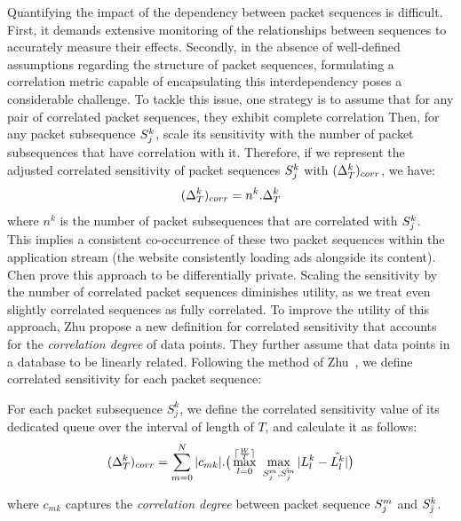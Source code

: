Quantifying the impact of the dependency between packet sequences is difficult. 
First, it demands extensive monitoring of the relationships between sequences to accurately measure their effects.
Secondly,  in the absence of well-defined assumptions regarding the structure of packet sequences, formulating a correlation metric capable of encapsulating this interdependency poses a considerable challenge.
To tackle this issue, one strategy is to assume that for any pair of correlated packet sequences, they exhibit complete correlation
Then, for any packet subsequence $S^k_j$, scale its sensitivity with the number of packet subsequences that have correlation with it.
Therefore, if we represent the adjusted correlated sensitivity of packet sequences $S^k_j$ with $(\Delta_T^k)_{corr}$, we have:
\begin{equation}\label{equ:naive-correlated-sensitivity}
  (\Delta_T^k)_{corr} = n^k.\Delta_T^k 
\end{equation}
\noindent where $n^k$ is the number of packet subsequences that are correlated with $S^k_j$.
\\
This implies a consistent co-occurrence of these two packet sequences within the application stream (\eg the website consistently loading ads alongside its content).
Chen prove this approach to be differentially private.
Scaling the sensitivity by the number of correlated packet sequences diminishes utility, as we treat even slightly correlated sequences as fully correlated.
To improve the utility of this approach, Zhu propose a new definition for correlated sensitivity that accounts for the \textit{correlation degree} of data points. 
They further assume that data points in a database to be linearly related.  
Following the method of Zhu~\etal, we define correlated sensitivity for each packet sequence:
\begin{definition}\label{def:correlated-sensitivity} 
  For each packet subsequence $S_{j}^k$, we define the correlated sensitivity value of its dedicated queue over the interval of length of $T$, and calculate it as follows:
  \begin{equation}\label{equ:correlated-sensitivity}
    (\Delta_T^k)_{corr} = \sum_{m=0}^{N} |c_{mk}|. \big( \max_{l = 0}^{\lceil \frac{W}{T} \rceil}~\max_{S_{j}^m,
    \hat{S_{j}^m}} | L_{l}^k - \hat{L_{l}^k} | \big) 
  \end{equation}
\end{definition}
\noindent where $c_{mk}$ captures the \textit{correlation degree} between packet sequence $S^m_j$ and $S^k_j$. 

